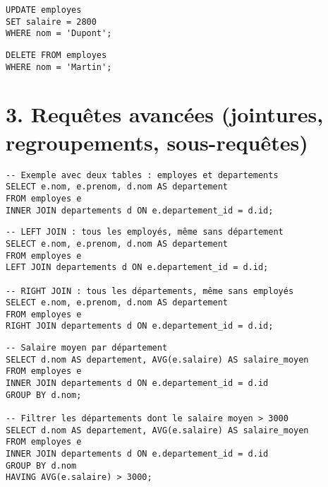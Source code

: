 \documentclass[a4paper,11pt]{article}
\begin{document}
\begin{tcolorbox}[colback=orange!5!white,colframe=orange!75!black,title=Modifier les données (UPDATE)]
\begin{verbatim}
UPDATE employes
SET salaire = 2800
WHERE nom = 'Dupont';
\end{verbatim}
\end{tcolorbox}

\begin{tcolorbox}[colback=red!5!white,colframe=red!75!black,title=Supprimer des données (DELETE)]
\begin{verbatim}
DELETE FROM employes
WHERE nom = 'Martin';
\end{verbatim}
\end{tcolorbox}


\section*{3. Requêtes avancées (jointures, regroupements, sous-requêtes)}

\begin{tcolorbox}[colback=blue!5!white,colframe=blue!75!black,title=Jointures internes (INNER JOIN)]
\begin{verbatim}
-- Exemple avec deux tables : employes et departements
SELECT e.nom, e.prenom, d.nom AS departement
FROM employes e
INNER JOIN departements d ON e.departement_id = d.id;
\end{verbatim}
\end{tcolorbox}

\begin{tcolorbox}[colback=green!5!white,colframe=green!75!black,title=Jointures externes (LEFT / RIGHT JOIN)]
\begin{verbatim}
-- LEFT JOIN : tous les employés, même sans département
SELECT e.nom, e.prenom, d.nom AS departement
FROM employes e
LEFT JOIN departements d ON e.departement_id = d.id;

-- RIGHT JOIN : tous les départements, même sans employés
SELECT e.nom, e.prenom, d.nom AS departement
FROM employes e
RIGHT JOIN departements d ON e.departement_id = d.id;
\end{verbatim}
\end{tcolorbox}

\begin{tcolorbox}[colback=yellow!5!white,colframe=yellow!75!black,title=Regroupement et agrégats (GROUP BY/ HAVING)]
\begin{verbatim}
-- Salaire moyen par département
SELECT d.nom AS departement, AVG(e.salaire) AS salaire_moyen
FROM employes e
INNER JOIN departements d ON e.departement_id = d.id
GROUP BY d.nom;

-- Filtrer les départements dont le salaire moyen > 3000
SELECT d.nom AS departement, AVG(e.salaire) AS salaire_moyen
FROM employes e
INNER JOIN departements d ON e.departement_id = d.id
GROUP BY d.nom
HAVING AVG(e.salaire) > 3000;
\end{verbatim}
\end{tcolorbox}
\end{document}

